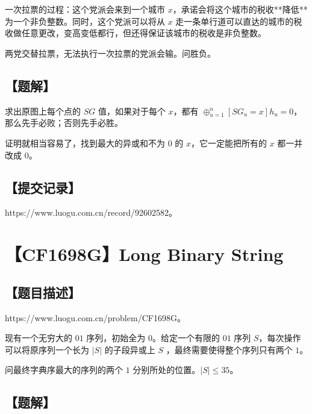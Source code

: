 \documentclass[UTF8,12pt,a4paper]{ctexart}
\begin{document}
	一次拉票的过程：这个党派会来到一个城市 $x$，承诺会将这个城市的税收**降低**为一个非负整数。同时，这个党派可以将从 $x$ 走一条单行道可以直达的城市的税收做任意更改，变高变低都行，但还得保证该城市的税收是非负整数。
	
	两党交替拉票，无法执行一次拉票的党派会输。问胜负。
	
	\subsection*{【题解】}
	
	求出原图上每个点的 $SG$ 值，如果对于每个 $x$，都有 $\oplus_{u=1}^n[SG_u = x]h_u=0$，那么先手必败；否则先手必胜。
	
	证明就相当容易了，找到最大的异或和不为 $0$ 的 $x$，它一定能把所有的 $x$ 都一并改成 $0$。
	
	\subsection*{【提交记录】}
	
	https://www.luogu.com.cn/record/92602582。
	
	
	\section*{【CF1698G】Long Binary String}
	
	\subsection*{【题目描述】}
	
	https://www.luogu.com.cn/problem/CF1698G。
	
	现有一个无穷大的 $01$ 序列，初始全为 $0$。给定一个有限的 $01$ 序列 $S$，每次操作可以将原序列一个长为 $|S|$ 的子段异或上  $S$ ，最终需要使得整个序列只有两个 $1$。
	
	问最终字典序最大的序列的两个 $1$ 分别所处的位置。$|S| \le 35$。
	
	\subsection*{【题解】}
	
\end{document}

